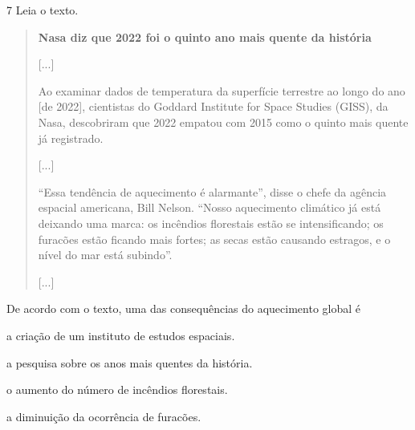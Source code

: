 \num{7} Leia o texto.

\begin{quote}
\textbf{Nasa diz que 2022 foi o quinto ano mais quente da história}

{[}...{]}

Ao examinar dados de temperatura da superfície terrestre ao longo do ano
[de 2022], cientistas do Goddard Institute for Space Studies (GISS), da
Nasa, descobriram que 2022 empatou com 2015 como o quinto mais quente já
registrado.

{[}...{]}

“Essa tendência de aquecimento é alarmante”, disse o chefe da agência
espacial americana, Bill Nelson. “Nosso aquecimento climático já está
deixando uma marca: os incêndios florestais estão se intensificando; os
furacões estão ficando mais fortes; as secas estão causando estragos, e
o nível do mar está subindo”.

{[}...{]}

\end{quote}

De acordo com o texto, uma das consequências do aquecimento global é

\begin{escolha}
\item a criação de um instituto de estudos espaciais.

\item a pesquisa sobre os anos mais quentes da história.

\item o aumento do número de incêndios florestais.

\item a diminuição da ocorrência de furacões.
\end{escolha}

